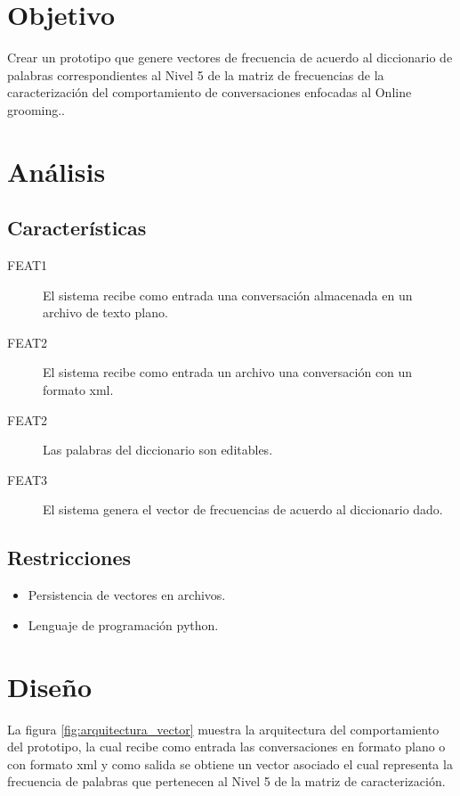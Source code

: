 \section{Objetivo}
Crear un prototipo que genere vectores de frecuencia de acuerdo al diccionario de palabras correspondientes al Nivel 5 de la matriz de frecuencias de la caracterizaci\'on del comportamiento de conversaciones enfocadas al Online grooming..

\section{An\'alisis}
\subsection{Caracter\'isticas}

\begin{description}
\item[FEAT1] El sistema recibe como entrada una conversaci\'on almacenada en un archivo de texto plano.
\item[FEAT2] El sistema recibe como entrada un archivo una conversaci\'on con un formato xml.
\item[FEAT2] Las palabras del diccionario son editables.
\item[FEAT3] El sistema genera el vector de frecuencias de acuerdo al diccionario dado.
\end{description}

\subsection{Restricciones}
\begin{itemize}
\item Persistencia de vectores en archivos.
\item Lenguaje de programaci\'on python.
\end{itemize}


\section{Dise\~no}

La figura \ref{fig:arquitectura_vector} muestra la arquitectura del comportamiento del prototipo, la cual recibe como entrada las conversaciones en formato plano o con formato xml y como salida se obtiene un vector asociado el cual representa la frecuencia de palabras que pertenecen al Nivel 5 de la matriz de caracterizaci\'on.

